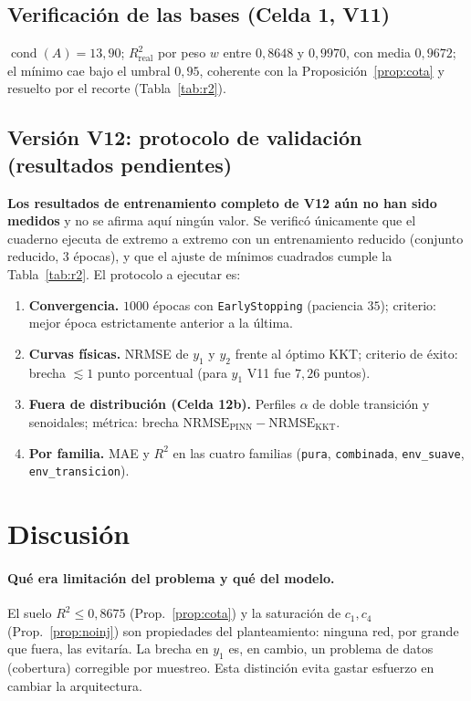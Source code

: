 \documentclass[11pt,twoside]{article}
\theoremstyle{definition}
\theoremstyle{remark}
\DeclareMathOperator{\cond}{cond}
\begin{document}
\subsection{Verificación de las bases (Celda 1, V11)}
$\cond(A)=13{,}90$; $R^2_{\mathrm{real}}$ por peso $w$ entre $0{,}8648$ y $0{,}9970$, con media $0{,}9672$; el mínimo cae bajo el umbral $0{,}95$, coherente con la Proposición~\ref{prop:cota} y resuelto por el recorte (Tabla~\ref{tab:r2}).

\subsection{Versión V12: protocolo de validación (resultados pendientes)}
\textbf{Los resultados de entrenamiento completo de V12 aún no han sido medidos} y no se afirma aquí ningún valor. Se verificó únicamente que el cuaderno ejecuta de extremo a extremo con un entrenamiento reducido (conjunto reducido, $3$ épocas), y que el ajuste de mínimos cuadrados cumple la Tabla~\ref{tab:r2}. El protocolo a ejecutar es:
\begin{enumerate}
\item \textbf{Convergencia.} $1000$ épocas con \texttt{EarlyStopping} (paciencia $35$); criterio: mejor época estrictamente anterior a la última.
\item \textbf{Curvas físicas.} NRMSE de $y_1$ y $y_2$ frente al óptimo KKT; criterio de éxito: brecha $\lesssim1$ punto porcentual (para $y_1$ V11 fue $7{,}26$ puntos).
\item \textbf{Fuera de distribución (Celda 12b).} Perfiles $\alpha$ de doble transición y senoidales; métrica: brecha $\mathrm{NRMSE}_{\mathrm{PINN}}-\mathrm{NRMSE}_{\mathrm{KKT}}$.
\item \textbf{Por familia.} MAE y $R^2$ en las cuatro familias (\texttt{pura}, \texttt{combinada}, \texttt{env\_suave}, \texttt{env\_transicion}).
\end{enumerate}

\section{Discusión}
\paragraph{Qué era limitación del problema y qué del modelo.} El suelo $R^2\le0{,}8675$ (Prop.~\ref{prop:cota}) y la saturación de $c_1,c_4$ (Prop.~\ref{prop:noinj}) son propiedades del planteamiento: ninguna red, por grande que fuera, las evitaría. La brecha en $y_1$ es, en cambio, un problema de datos (cobertura) corregible por muestreo. Esta distinción evita gastar esfuerzo en cambiar la arquitectura.
\end{document}
